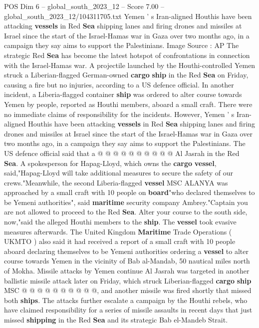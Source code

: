 \begin{textsample}{POS Dim 6 – global\_south\_2023\_12 – Score 7.00 – global\_south\_2023\_12/104311705.txt}  \label{ex:f6_pos_129}
Yemen ' s Iran-aligned Houthis have been attacking \textbf{vessels} in Red \textbf{Sea} shipping lanes and firing drones and missiles at Israel since the start of the Israel-Hamas war in Gaza over two months ago, in a campaign they say aims to support the Palestinians.
Image Source : AP The strategic Red \textbf{Sea} has become the latest hotspot of confrontations in connection with the Israel-Hamas war.
A projectile launched by the Houthi-controlled Yemen struck a Liberian-flagged German-owned \textbf{cargo} \textbf{ship} in the Red \textbf{Sea} on Friday, causing a fire but no injuries, according to a US defence official.
In another incident, a Liberia-flagged container \textbf{ship} was ordered to alter course towards Yemen by people, reported as Houthi members, aboard a small craft.
There were no immediate claims of responsibility for the incidents.
However, Yemen ' s Iran-aligned Houthis have been attacking \textbf{vessels} in Red \textbf{Sea} shipping lanes and firing drones and missiles at Israel since the start of the Israel-Hamas war in Gaza over two months ago, in a campaign they say aims to support the Palestinians.
The US defence official said that a @ @ @ @ @ @ @ @ @ @ Al Jasrah in the Red \textbf{Sea}.
A spokesperson for Hapag-Lloyd, which owns the \textbf{cargo} \textbf{vessel}, said,"Hapag-Lloyd will take additional measures to secure the safety of our crews."Meanwhile, the second Liberia-flagged \textbf{vessel} MSC ALANYA was approached by a small craft with 10 people on \textbf{board}"who declared themselves to be Yemeni authorities", said \textbf{maritime} security company Ambrey."Captain you are not allowed to proceed to the Red \textbf{Sea}.
Alter your course to the south side, now,"said the alleged Houthi members to the \textbf{ship}.
The \textbf{vessel} took evasive measures afterwards.
The United Kingdom \textbf{Maritime} Trade Operations ( UKMTO ) also said it had received a report of a small craft with 10 people aboard declaring themselves to be Yemeni authorities ordering a \textbf{vessel} to alter course towards Yemen in the vicinity of Bab al-Mandab, 50 nautical miles north of Mokha.
Missile attacks by Yemen continue Al Jasrah was targeted in another ballistic missile attack later on Friday, which struck Liberian-flagged \textbf{cargo} \textbf{ship} MSC @ @ @ @ @ @ @ @ @ @, and another missile was fired shortly that missed both \textbf{ships}.
The attacks further escalate a campaign by the Houthi rebels, who have claimed responsibility for a series of missile assaults in recent days that just missed \textbf{shipping} in the Red \textbf{Sea} and its strategic Bab el-Mandeb Strait.

\end{textsample}
